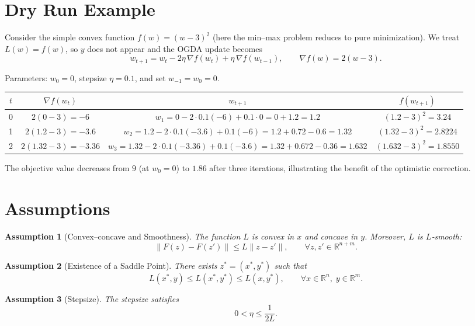 \documentclass{article}
\newtheorem{assumption}{Assumption}
\newcommand{\R}{\mathbb{R}}
\begin{document}
\section*{Dry Run Example}
Consider the simple convex function $f(w)=(w-3)^{2}$ (here the min–max problem reduces to pure minimization).  
We treat $L(w)=f(w)$, so $y$ does not appear and the OGDA update becomes
\[
w_{t+1}=w_{t}-2\eta\,\nabla f(w_{t})+\eta\,\nabla f(w_{t-1}),
\qquad \nabla f(w)=2(w-3).
\]

Parameters: $w_{0}=0$, stepsize $\eta=0.1$, and set $w_{-1}=w_{0}=0$.

\begin{center}
\begin{tabular}{c|c|c|c}
$t$ & $\nabla f(w_{t})$ & $w_{t+1}$ & $f(w_{t+1})$\\ \hline
0 & $2(0-3)=-6$ & $w_{1}=0-2\cdot0.1(-6)+0.1\cdot0=0+1.2=1.2$ & $(1.2-3)^{2}=3.24$\\[2mm]
1 & $2(1.2-3)=-3.6$ & $w_{2}=1.2-2\cdot0.1(-3.6)+0.1(-6)=1.2+0.72-0.6=1.32$ & $(1.32-3)^{2}=2.8224$\\[2mm]
2 & $2(1.32-3)=-3.36$ & $w_{3}=1.32-2\cdot0.1(-3.36)+0.1(-3.6)=1.32+0.672-0.36=1.632$ & $(1.632-3)^{2}=1.8550$
\end{tabular}
\end{center}
The objective value decreases from $9$ (at $w_{0}=0$) to $1.86$ after three iterations, illustrating the benefit of the optimistic correction.

\newpage

\section*{Assumptions}
\begin{assumption}[Convex–concave and Smoothness]\label{ass:smooth}
The function $L$ is convex in $x$ and concave in $y$. Moreover, $L$ is $L$‑smooth:
\[
\|F(z)-F(z')\|\le L\|z-z'\|,\qquad\forall z,z'\in\R^{n+m}.
\]
\end{assumption}
\begin{assumption}[Existence of a Saddle Point]\label{ass:saddle}
There exists $z^{*}=(x^{*},y^{*})$ such that
\[
L(x^{*},y)\le L(x^{*},y^{*})\le L(x,y^{*}),\qquad\forall x\in\R^{n},\;y\in\R^{m}.
\]
\end{assumption}
\begin{assumption}[Stepsize]\label{ass:stepsize}
The stepsize satisfies
\[
0<\eta\le\frac{1}{2L}.
\]
\end{assumption}
\end{document}
